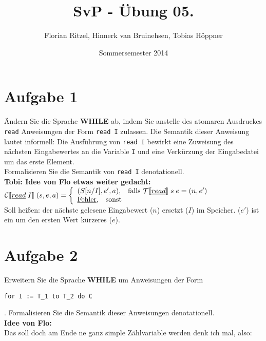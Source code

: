 \documentclass[ngerman,a4paper]{report}
\author{Florian Ritzel, Hinnerk van Bruinehsen, Tobias Höppner}
\title{SvP - Übung 05. }
\date{Sommersemester 2014}
\renewcommand{\maketitle}{}
\begin{document}
\maketitle
\section*{Aufgabe 1}
Ändern Sie die Sprache \textbf{WHILE} ab, indem Sie anstelle des atomaren Ausdruckes \lstinline!read! Anweisungen der Form \lstinline!read I! zulassen. Die Semantik dieser Anweisung lautet informell: Die Ausführung von \lstinline!read I! bewirkt eine Zuweisung des nächsten Eingabewertes an die Variable \lstinline!I! und eine Verkürzung der Eingabedatei um das erste Element.\\
Formalisieren Sie die Semantik von \lstinline!read I! denotationell.\\

%
\textbf{Tobi: Idee von Flo etwas weiter gedacht:}\\
$		\mathcal{C}
[\![\underline{read}\;I]\!]\;(s,e,a) = \left\lbrace\begin{array}{l l} (S[n/I], e', a)\text{,}\quad\text{falls }\mathcal{T}
[\![\underline{read}]\!]\;s\;e = (n, e')\\
		\underline{\text{Fehler}}\text{,}\quad\text{sonst} \end{array}\right.$\\
Soll heißen: der nächste gelesene Eingabewert ($n$) ersetzt ($I$) im Speicher. ($e'$) ist ein um den ersten Wert kürzeres ($e$).\\
\section*{Aufgabe 2}
Erweitern Sie die Sprache \textbf{WHILE} um Anweisungen der Form 
\begin{lstlisting}
for I := T_1 to T_2 do C
\end{lstlisting}.
Formalisieren Sie die Semantik dieser Anweisungen denotationell.\\

\textbf{Idee von Flo:}\\

Das soll doch am Ende ne ganz simple Zählvariable werden denk ich mal, also:\\
\end{document}
